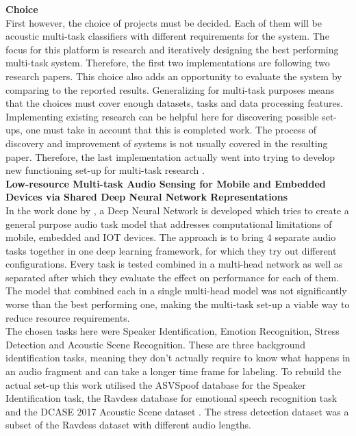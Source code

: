 {\large \textbf{Choice}} \\

First however, the choice of projects must be decided. Each of them will be acoustic multi-task classifiers with different requirements for the system. The focus for this platform is research and iteratively designing the best performing multi-task system. Therefore, the first two implementations are following two research papers. This choice also adds an opportunity to evaluate the system by comparing to the reported results. Generalizing for multi-task purposes means that the choices must cover enough datasets, tasks and data processing features. Implementing existing research can be helpful here for discovering possible set-ups, one must take in account that this is completed work. The process of discovery and improvement of systems is not usually covered in the resulting paper. Therefore, the last implementation actually went into trying to develop new functioning set-up for multi-task research . \\



{\large \textbf{Low-resource Multi-task Audio Sensing for Mobile and Embedded Devices via Shared Deep Neural Network Representations}} \\

In the work done by \citet{georgiev2017low}, a Deep Neural Network is developed which tries to create a general purpose audio task model that addresses computational limitations of mobile, embedded and IOT devices. The approach is to bring 4 separate audio tasks together in one deep learning framework, for which they try out different configurations. Every task is tested combined in a multi-head network as well as separated after which they evaluate the effect on performance for each of them. The model that combined each in a single multi-head model was not significantly worse than the best performing one, making the multi-task set-up  a viable way to reduce resource requirements. \\

The chosen tasks here were Speaker Identification, Emotion Recognition, Stress Detection and Acoustic Scene Recognition. These are three background identification tasks, meaning they don't actually require to know what happens in an audio fragment and can take a longer time frame for labeling. To rebuild the actual set-up this work utilised the ASVSpoof database \cite{wu2015asvspoof} for the Speaker Identification task, the Ravdess database \cite{livingstone2012ravdess} for emotional speech recognition task and the DCASE 2017 Acoustic Scene dataset \cite{mesaros2017dcase}. The stress detection dataset was a subset of the Ravdess dataset with different audio lengths. \\

